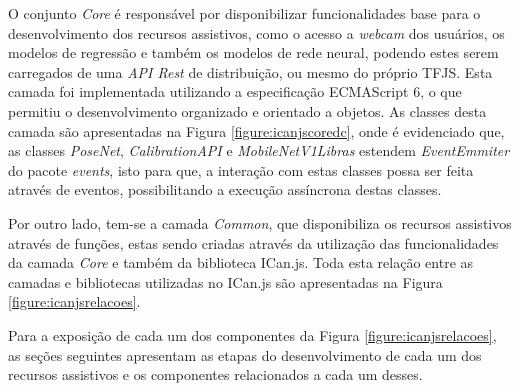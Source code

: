 
\par O conjunto \textit{Core} é responsável por disponibilizar funcionalidades base para o desenvolvimento dos recursos assistivos, como o acesso a \textit{webcam} dos usuários, os modelos de regressão e também os modelos de rede neural, podendo estes serem carregados de uma \textit{API Rest} de distribuição, ou mesmo do próprio TFJS. Esta camada foi implementada utilizando a especificação ECMAScript 6, o que permitiu o desenvolvimento organizado e orientado a objetos. As classes desta camada são apresentadas na Figura \ref{figure:icanjscoredc}, onde é evidenciado que, as classes \textit{PoseNet}, \textit{CalibrationAPI} e \textit{MobileNetV1Libras} estendem \textit{EventEmmiter} do pacote \textit{events}, isto para que, a interação com estas classes possa ser feita através de eventos, possibilitando a execução assíncrona destas classes.


\par Por outro lado, tem-se a camada \textit{Common}, que disponibiliza os recursos assistivos através de funções, estas sendo criadas através da utilização das funcionalidades da camada \textit{Core} e também da biblioteca ICan.js. Toda esta relação entre as camadas e bibliotecas utilizadas no ICan.js são apresentadas na Figura \ref{figure:icanjsrelacoes}.


\par Para a exposição de cada um dos componentes da Figura \ref{figure:icanjsrelacoes}, as seções seguintes apresentam as etapas do desenvolvimento de cada um dos recursos assistivos e os componentes relacionados a cada um desses.



